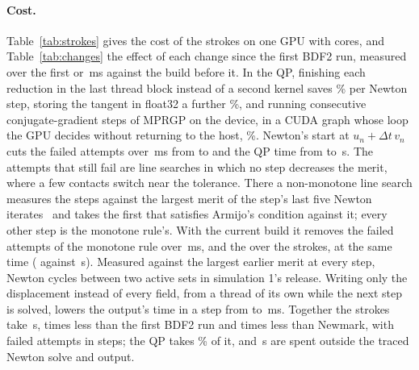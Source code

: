 \documentclass[sigconf,nonacm]{acmart}
\begin{document}
\paragraph{Cost.} Table~\ref{tab:strokes} gives the cost of the \trStrokes{} strokes on one GPU
with \machineCores{} cores, and Table~\ref{tab:changes} the effect of each change since the first
BDF2 run, measured over the first \trWindowFinish{} or \trWindowStart\,\si{\milli\second} against
the build before it. In the QP, finishing each reduction in the last thread block instead of a
second kernel saves \trFinishGain\% per Newton step, storing the tangent in float32 a further
\trFloatGain\%, and running consecutive conjugate-gradient steps of MPRGP on the device, in a CUDA
graph whose loop the GPU decides without returning to the host, \trRunsGain\%. Newton's start at
$u_n+\Delta t\,v_n$ cuts the failed attempts over \trWindowStart\,\si{\milli\second} from
\trFailedBaseWindow{} to \trFailedStartWindow{} and the QP time from \trQpBaseWindow{} to
\trQpStartWindow\,\si{\second}. The attempts that still fail are line searches in which no step
decreases the merit, where a few contacts switch near the tolerance. There a non-monotone line search
measures the steps against the largest merit of the step's last five Newton iterates~\cite{grippo1986}
and takes the first that satisfies Armijo's condition against it; every other step is the monotone
rule's. With the current build it removes the \trFailedMonoWindow{} failed attempts of the
monotone rule over \trWindowNonmono\,\si{\milli\second}, and the \trFailedFinalMono{} over the
\trStrokes{} strokes, at the same time (\trSteppingFinal{} against \trSteppingFinalMono\,\si{\second}).
Measured against the largest earlier merit at every step, Newton cycles between two active sets in
simulation 1's release. Writing only the displacement instead of every field, from a thread of its
own while the next step is solved, lowers the output's time in a step from \trWritePerStepBdf{} to
\trWritePerStepFinal\,\si{\milli\second}.
Together the \trStrokes{} strokes take \trSteppingFinal\,\si{\second}, \trSpeedBdf{} times less
than the first BDF2 run and \trSpeedNewmark{} times less than Newmark, with \trFailedFinal{} failed
attempts in \trStepsFinal{} steps; the QP takes \trQpShareFinal\% of it, and
\trOtherFinal\,\si{\second} are spent outside the traced Newton solve and output.
\end{document}
